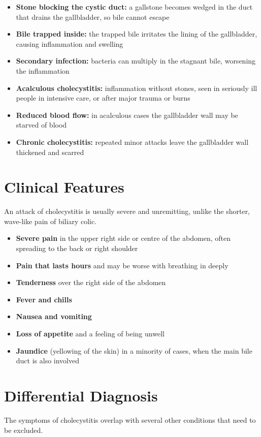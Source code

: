 \begin{itemize}
    \item \textbf{Stone blocking the cystic duct:} a gallstone becomes wedged in the duct that drains the gallbladder, so bile cannot escape
    \item \textbf{Bile trapped inside:} the trapped bile irritates the lining of the gallbladder, causing inflammation and swelling
    \item \textbf{Secondary infection:} bacteria can multiply in the stagnant bile, worsening the inflammation
    \item \textbf{Acalculous cholecystitis:} inflammation without stones, seen in seriously ill people in intensive care, or after major trauma or burns
    \item \textbf{Reduced blood flow:} in acalculous cases the gallbladder wall may be starved of blood
    \item \textbf{Chronic cholecystitis:} repeated minor attacks leave the gallbladder wall thickened and scarred
\end{itemize}

\section*{Clinical Features}
An attack of cholecystitis is usually severe and unremitting, unlike the shorter, wave-like pain of biliary colic.

\begin{itemize}
    \item \textbf{Severe pain} in the upper right side or centre of the abdomen, often spreading to the back or right shoulder
    \item \textbf{Pain that lasts hours} and may be worse with breathing in deeply
    \item \textbf{Tenderness} over the right side of the abdomen
    \item \textbf{Fever and chills}
    \item \textbf{Nausea and vomiting}
    \item \textbf{Loss of appetite} and a feeling of being unwell
    \item \textbf{Jaundice} (yellowing of the skin) in a minority of cases, when the main bile duct is also involved
\end{itemize}

\section*{Differential Diagnosis}
The symptoms of cholecystitis overlap with several other conditions that need to be excluded.

